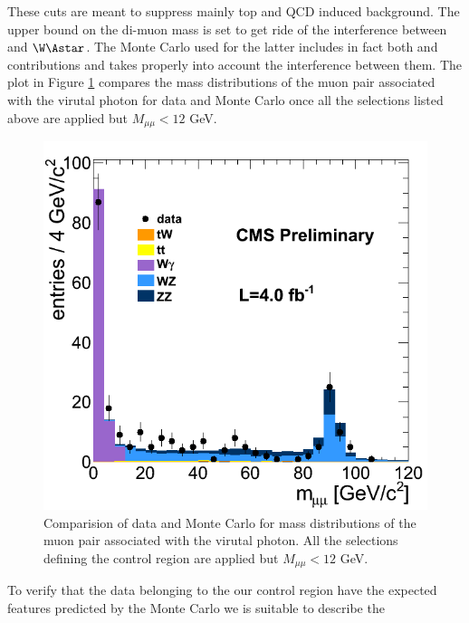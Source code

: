 These cuts are meant to suppress mainly top and QCD induced background.
The upper bound on the di-muon mass is set to get ride of the interference between
\Wgstar and \ensuremath{\W\Astar}. 
The Monte Carlo used for the latter includes in fact both \Astar and \Zstar contributions
and takes properly into account the interference between them.
The plot in Figure \ref{fig:WgammaStarMass} compares the 
mass distributions of the muon pair associated with the virutal photon for data and Monte Carlo
once all the selections listed above are applied but \ensuremath{M_{\mu\mu}<12} GeV.

\begin{figure}[hbt]
\begin{center}
\includegraphics[width=0.5\linewidth]{figures/WGammaStar_mass_wholeSpectrum.png} 
\caption{\label{fig:WgammaStarMass}\protect Comparision of data and Monte Carlo for  
mass distributions of the muon pair associated with the virutal photon. 
All the selections defining the \Wgstar control region are applied but \ensuremath{M_{\mu\mu}<12} GeV.}
\end{center}
\end{figure}

To verify that the data belonging to the our control region have the expected features predicted
by the Monte Carlo we is suitable to describe the 



